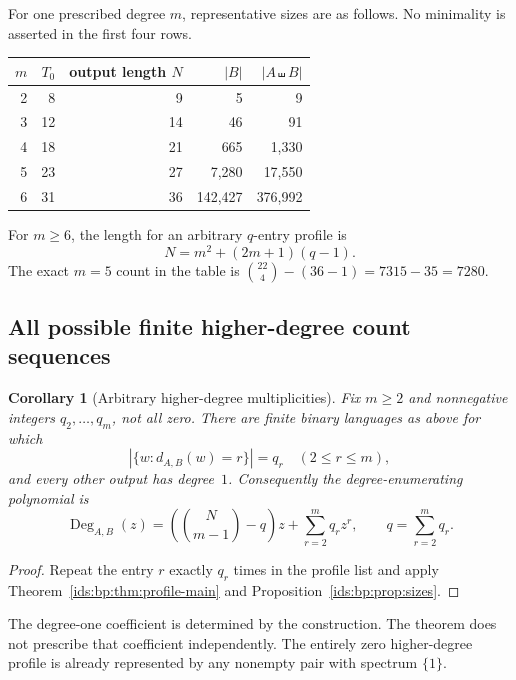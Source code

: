\documentclass[11pt,letterpaper]{article}
\newtheorem{corollary}[theorem]{Corollary}
\theoremstyle{definition}\newtheorem{definition}[theorem]{Definition}
\theoremstyle{remark}\newtheorem{remark}[theorem]{Remark}
\theoremstyle{definition}\newtheorem{question}[theorem]{Question}
\newcommand{\sh}{\mathbin{\shuffle}}
\begin{document}
For one prescribed degree $m$, representative sizes are as follows. No
minimality is asserted in the first four rows.
\begin{center}
\begin{tabular}{@{}rrrrr@{}}
\toprule
$m$ & $T_0$ & output length $N$ & $|B|$ & $|A\sh B|$\\
\midrule
2 & 8 & 9 & 5 & 9\\
3 & 12 & 14 & 46 & 91\\
4 & 18 & 21 & 665 & 1,330\\
5 & 23 & 27 & 7,280 & 17,550\\
6 & 31 & 36 & 142,427 & 376,992\\
\bottomrule
\end{tabular}
\end{center}
For $m\geq6$, the length for an arbitrary $q$-entry profile is
\begin{equation}
 N=m^2+(2m+1)(q-1).
 \label{ids:bp:eq:large-m-length}
\end{equation}
The exact $m=5$ count in the table is
$\binom{22}{4}-(36-1)=7315-35=7280$.

\subsection{All possible finite higher-degree count sequences}
\begin{corollary}[Arbitrary higher-degree multiplicities]
\label{ids:bp:cor:multiplicity}
Fix $m\geq2$ and nonnegative integers $q_2,\ldots,q_m$, not all zero.
There are finite binary languages as above for which
\[
 |\{w:d_{A,B}(w)=r\}|=q_r\quad(2\leq r\leq m),
\]
and every other output has degree~$1$. Consequently the degree-enumerating
polynomial is
\begin{equation}
 \operatorname{Deg}_{A,B}(z)=\left(\binom{N}{m-1}-q\right)z
                         +\sum_{r=2}^m q_rz^r,
 \qquad q=\sum_{r=2}^m q_r.
 \label{ids:bp:eq:aggregate-polynomial}
\end{equation}
\end{corollary}
\begin{proof}
Repeat the entry $r$ exactly $q_r$ times in the profile list and apply
Theorem~\ref{ids:bp:thm:profile-main} and Proposition~\ref{ids:bp:prop:sizes}.
\end{proof}
The degree-one coefficient is determined by the construction. The theorem
does not prescribe that coefficient independently. The entirely zero
higher-degree profile is already represented by any nonempty pair with
spectrum $\{1\}$.
\end{document}
